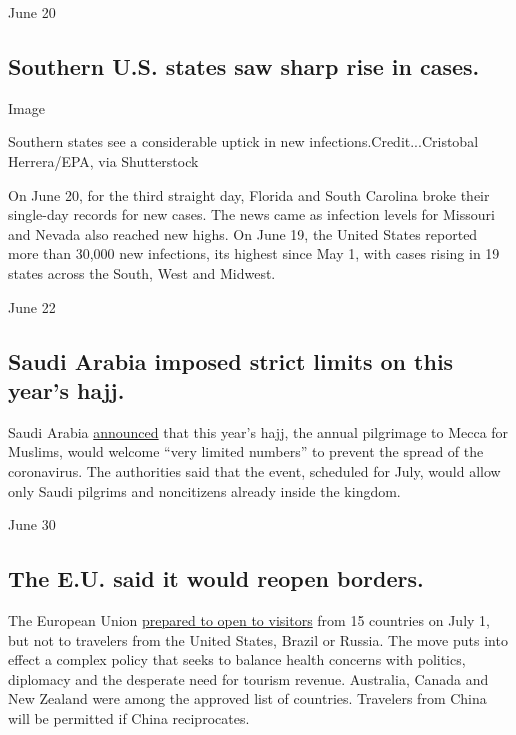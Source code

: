 June 20

\hypertarget{southern-us-states-saw-sharp-rise-in-cases}{%
\subsection{Southern U.S. states saw sharp rise in
cases.}\label{southern-us-states-saw-sharp-rise-in-cases}}

Image

Southern states see a considerable uptick in new
infections.Credit...Cristobal Herrera/EPA, via Shutterstock

On June 20, for the third straight day, Florida and South Carolina broke
their single-day records for new cases. The news came as infection
levels for Missouri and Nevada also reached new highs. On June 19, the
United States reported more than 30,000 new infections, its highest
since May 1, with cases rising in 19 states across the South, West and
Midwest.

June 22

\hypertarget{saudi-arabia-imposed-strict-limits-on-this-years-hajj}{%
\subsection{Saudi Arabia imposed strict limits on this year's
hajj.}\label{saudi-arabia-imposed-strict-limits-on-this-years-hajj}}

Saudi Arabia
\href{https://www.nytimes3xbfgragh.onion/2020/06/22/world/middleeast/saudi-arabia-hajj-mecca-pilgrims.html?action=click\&module=RelatedLinks\&pgtype=Article}{announced}
that this year's hajj, the annual pilgrimage to Mecca for Muslims, would
welcome ``very limited numbers'' to prevent the spread of the
coronavirus. The authorities said that the event, scheduled for July,
would allow only Saudi pilgrims and noncitizens already inside the
kingdom.

June 30

\hypertarget{the-eu-said-it-would-reopen-borders}{%
\subsection{The E.U. said it would reopen
borders.}\label{the-eu-said-it-would-reopen-borders}}

The European Union
\href{https://www.nytimes3xbfgragh.onion/2020/06/30/world/europe/eu-reopening-blocks-us-travelers.html?action=click\&module=RelatedLinks\&pgtype=Article}{prepared
to open to visitors} from 15 countries on July 1, but not to travelers
from the United States, Brazil or Russia. The move puts into effect a
complex policy that seeks to balance health concerns with politics,
diplomacy and the desperate need for tourism revenue. Australia, Canada
and New Zealand were among the approved list of countries. Travelers
from China will be permitted if China reciprocates.

